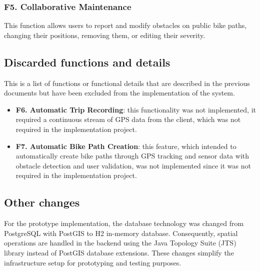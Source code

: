 \subsubsection*{F5. Collaborative Maintenance}
This function allows users to report and modify obstacles on public bike paths, changing their positions, removing them, or editing their severity.

\subsection{Discarded functions and details}
This is a list of functions or functional details that are described in the previous documents but have been excluded from the implementation of the system.
\begin{itemize}
    \item \textbf{F6. Automatic Trip Recording}: this functionality was not implemented, it required a continuous stream of GPS data from the client, which was not required in the implementation project.
    \item \textbf{F7. Automatic Bike Path Creation}: this feature, which intended to automatically create bike paths through GPS tracking and sensor data with obstacle detection and user validation, was not implemented since it was not required in the implementation project.
\end{itemize}

\subsection{Other changes}
For the prototype implementation, the database technology was changed from PostgreSQL with PostGIS to H2 in-memory database. Consequently, spatial operations are handled in the backend using the Java Topology Suite (JTS) library instead of PostGIS database extensions. These changes simplify the infrastructure setup for prototyping and testing purposes.
